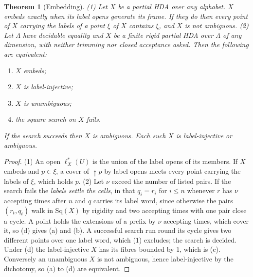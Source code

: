 \documentclass{lmcs}
\newtheorem{theorem}{Theorem}[section]
\theoremstyle{definition}
\theoremstyle{remark}
\newcommand{\upc}[1]{{\uparrow}#1}
\providecommand{\Sq}[1]{\mathrm{Sq}(#1)}
\providecommand{\lst}[1]{\ell^{*}_{#1}}
\begin{document}
\begin{theorem}[Embedding]\label{thm:unamb}\label{thm:is-image}
(1) Let $X$ be a partial HDA over any alphabet. $X$ embeds exactly when its label opens generate its
  frame. If they do then every point of $X$
  carrying the labels of a point $\xi$ of $X$ contains $\xi$, and $X$ is not
  ambiguous.
(2) Let $\Lambda$ have decidable equality and $X$ be a finite rigid partial HDA over $\Lambda$ of any dimension,
  with neither trimming nor closed acceptance asked. Then the following are
  equivalent:
  \begin{enumerate}[label=(\alph*),nosep,leftmargin=*]
  \item $X$ embeds;
  \item $X$ is label-injective;
  \item $X$ is unambiguous;
  \item the square search on $X$ fails.
  \end{enumerate}
  If the search succeeds then $X$ is ambiguous. Each such $X$ is label-injective or
  ambiguous.
\end{theorem}

\begin{proof}
(1) An open $\lst{X}(U)$ is the union of the label opens of its members. If $X$
embeds and $p\in\xi$, a cover of $\upc{p}$ by label opens meets every point carrying the labels of $\xi$, which
holds $p$.
(2) Let $\nu$ exceed the number of listed pairs. If the search fails the \emph{labels settle the cells}, in that
$q_i=r_i$ for $i\leq n$ whenever $r$ has $\nu$ accepting times after $n$ and $q$ carries its label word, since otherwise
the pairs $(r_t,q_t)$ walk in $\Sq{X}$ by rigidity and two accepting times with one pair close a
cycle. A point holds the
extensions of a prefix by $\nu$ accepting times, which cover it, so (d) gives (a) and
(b).
A successful search run round its cycle gives two different points over one label
word, which (1) excludes; the search is
decided.
Under (d) the label-injective $X$ has its fibres bounded by $1$, which is (c).
Conversely an unambiguous $X$ is not ambiguous, hence label-injective by the
dichotomy, so (a) to (d) are equivalent.
\end{proof}
\end{document}
